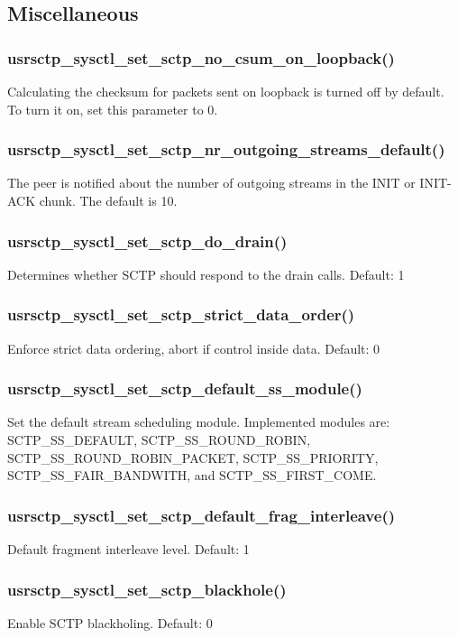 \documentclass[a4paper]{article}
\begin{document}
\subsection{Miscellaneous}
\subsubsection{usrsctp\_sysctl\_set\_sctp\_no\_csum\_on\_loopback()}
Calculating the checksum for packets sent on loopback is turned off by default.
To turn it on, set this parameter to 0.

\subsubsection{usrsctp\_sysctl\_set\_sctp\_nr\_outgoing\_streams\_default()}
The peer is notified about the number of outgoing streams in the INIT or INIT-ACK chunk.
The default is 10. 

\subsubsection{usrsctp\_sysctl\_set\_sctp\_do\_drain()}
Determines whether SCTP should respond to the drain calls. Default: 1		

\subsubsection{usrsctp\_sysctl\_set\_sctp\_strict\_data\_order()}
Enforce strict data ordering, abort if control inside data. Default: 0

\subsubsection{usrsctp\_sysctl\_set\_sctp\_default\_ss\_module()}
Set the default stream scheduling module. Implemented modules are:
SCTP\_SS\_DEFAULT, SCTP\_SS\_ROUND\_ROBIN, SCTP\_SS\_ROUND\_ROBIN\_PACKET,
SCTP\_SS\_PRIORITY, SCTP\_SS\_FAIR\_BANDWITH, and SCTP\_SS\_FIRST\_COME.

\subsubsection{usrsctp\_sysctl\_set\_sctp\_default\_frag\_interleave()}
Default fragment interleave level. Default: 1

\subsubsection{usrsctp\_sysctl\_set\_sctp\_blackhole()}
Enable SCTP blackholing. Default: 0
\end{document}
